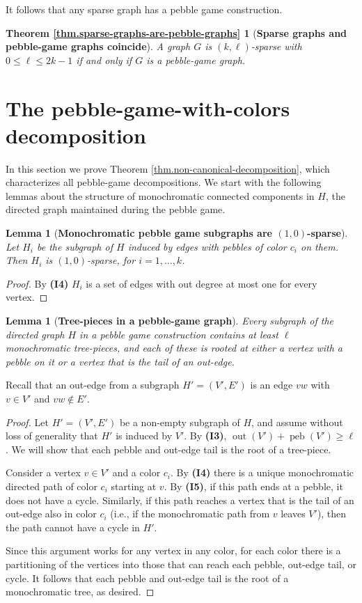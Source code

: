 \documentclass[Svgc,nospthms]{Svgc}
\newtheorem{lemma}[theorem]{Lemma}
\newcommand{\refthm}[1]{Theorem \ref{thm.#1}}
\newcommand{\labellem}[1]{\label{lem.#1}}
\newcommand{\restateenv}{ZZZ}
\newenvironment{restate}[1]{
  \renewcommand{\restateenv}{restate.#1}
  \newtheorem*{\restateenv}{\refthm{#1}}
  \begin{\restateenv}
}{\end{\restateenv}}
\newcommand{\peb}{\ensuremath{\operatorname{peb}}}
\newcommand{\out}{\ensuremath{\operatorname{out}}}
\begin{document}
	
It  follows that any sparse graph has a pebble game construction. 
\begin{restate}{sparse-graphs-are-pebble-graphs}[{\bf Sparse graphs and pebble-game graphs coincide}]
A graph $G$  is $(k,\ell)$-sparse  with $0\le\ell\le 2k-1$ if and only if $G$ is a pebble-game graph.
\end{restate}
	
\section{The pebble-game-with-colors decomposition}\label{pg-decomp}
In this section we prove \refthm{non-canonical-decomposition}, which characterizes
all pebble-game decompositions.
We start with the following lemmas about the structure of monochromatic connected components in $H$,
the directed graph maintained during the pebble game.
	
\begin{lemma}[{\bf Monochromatic pebble game subgraphs are $(1,0)$-sparse}]\labellem{each-color-is-map-sparse}
	Let $H_i$ be the subgraph of $H$ induced by edges with pebbles of color $c_i$ on them. 
	Then $H_i$ is $(1,0)$-sparse, for $i=1,\ldots,k$.  
\end{lemma}
\begin{proof}
	By {\bf (I4)} $H_i$ is a set of edges with out degree at most one for every vertex. 
	 
\end{proof}
	


\begin{lemma}[{\bf Tree-pieces in a pebble-game graph}]
\labellem{subtrees}
Every subgraph of the directed graph $H$ in a pebble 
game construction contains at least $\ell$ monochromatic tree-pieces, 
and each of these is rooted at either a vertex with a pebble on it  
or a vertex that is the tail of an out-edge.
\end{lemma}
Recall that an out-edge from a subgraph $H'=(V',E')$ is an edge $vw$ with $v\in V'$
and $vw\notin E'$.
\begin{proof}
Let $H'=(V',E')$ be a non-empty subgraph of $H$, and assume without loss of generality that $H'$ is 
induced by $V'$.  By {\bf (I3)}, $\out (V')+\peb (V')\ge \ell$.  We will show that each pebble and 
out-edge tail is the root of a tree-piece.

Consider a vertex $v\in V'$ and a color $c_i$.  By {\bf (I4)} there is a unique monochromatic 
directed path of color $c_i$ starting at $v$.  By {\bf (I5)}, if this path ends at a pebble,
it does not have a cycle.  Similarly, if this path reaches a vertex that is the tail of an out-edge
also in color $c_i$ (i.e., if the monochromatic path from $v$ leaves $V'$), then the path cannot 
have a cycle in $H'$.

Since this argument works for any vertex in any color, for each color there is a partitioning 
of the vertices into those that can reach each pebble, out-edge tail, or cycle.  It follows
that each pebble and out-edge tail is the root of a monochromatic tree, as desired. 
 \end{proof}
\end{document}
